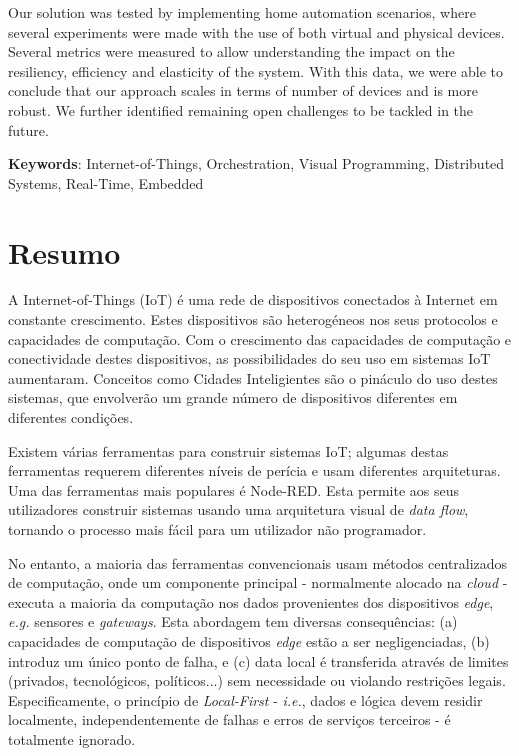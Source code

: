 Our solution was tested by implementing home automation scenarios, where several experiments were made with the use of both virtual and physical devices. Several metrics were measured to allow understanding the impact on the resiliency, efficiency and elasticity of the system. With this data, we were able to conclude that our approach scales in terms of number of devices and is more robust. We further identified remaining open challenges to be tackled in the future.

\vspace*{10mm}\noindent

\textbf{Keywords}: Internet-of-Things, Orchestration, Visual Programming, Distributed Systems, Real-Time, Embedded


\chapter*{Resumo}

A Internet-of-Things (IoT) é uma rede de dispositivos conectados à Internet em constante crescimento. Estes dispositivos são heterogéneos nos seus protocolos e capacidades de computação. Com o crescimento das capacidades de computação e conectividade destes dispositivos, as possibilidades do seu uso em sistemas IoT aumentaram. Conceitos como Cidades Inteligientes são o pináculo do uso destes sistemas, que envolverão um grande número de dispositivos diferentes em diferentes condições.

Existem várias ferramentas para construir sistemas IoT; algumas destas ferramentas requerem diferentes níveis de perícia e usam diferentes arquiteturas. Uma das ferramentas mais populares é Node-RED. Esta permite aos seus utilizadores construir sistemas usando uma arquitetura visual de \emph{data flow}, tornando o processo mais fácil para um utilizador não programador.

No entanto, a maioria das ferramentas convencionais usam métodos centralizados de computação, onde um componente principal - normalmente alocado na \emph{cloud} - executa a maioria da computação nos dados provenientes dos dispositivos \emph{edge}, \emph{e.g.} sensores e \emph{gateways}. Esta abordagem tem diversas consequências: (a) capacidades de computação de dispositivos \emph{edge} estão a ser negligenciadas, (b) introduz um único ponto de falha, e (c) data local é transferida através de limites (privados, tecnológicos, políticos...) sem necessidade ou violando restrições legais. Especificamente, o princípio de \emph{Local-First} - \emph{i.e.}, dados e lógica devem residir localmente, independentemente de falhas e erros de serviços terceiros - é totalmente ignorado.

